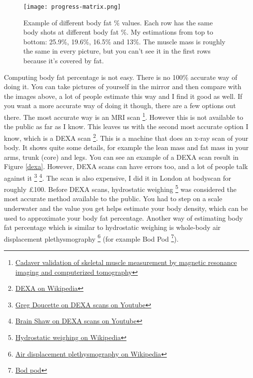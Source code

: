 \documentclass[openany, 12pt]{book}
\begin{document}
	\begin{figure}[h]
		\centering
		\texttt{[image: progress-matrix.png]}
		\caption{Example of different body fat \% values. Each row has the same body shots at different body fat \%. My estimations from top to bottom: 25.9\%, 19.6\%, 16.5\% and 13\%.
                The muscle mass is roughly the same in every picture, but you can't see it in the first rows because it's covered by fat.}
                \label{bodyfat}
	\end{figure}
	
	Computing body fat percentage is not easy. There is no 100\% accurate way of doing it. You can take pictures of yourself in the mirror and then compare with the images above,
        a lot of people estimate this way and I find it good as well. If you want a more accurate way of doing it though, there are a few options out there. The most accurate way is an MRI scan
        \footnote{\href{https://pubmed.ncbi.nlm.nih.gov/9655763/}{Cadaver validation of skeletal muscle measurement by magnetic resonance imaging and computerized tomography}}.
        However this is not available to the public as far as I know. This leaves us with the second most accurate option I know, which is a DEXA scan
        \footnote{\href{https://en.wikipedia.org/wiki/Dual-energy_X-ray_absorptiometry}{DEXA on Wikipedia}}. This is a machine that does an x-ray scan of your body. It shows quite some details,
        for example the lean mass and fat mass in your arms, trunk (core) and legs. You can see an example of a DEXA scan result in Figure \ref{dexa}.
        However, DEXA scans can have errors too, and a lot of people talk against it
        \footnote{\href{https://www.youtube.com/watch?v=2Gg4Jm5KS1Y}{Greg Doucette on DEXA scans on Youtube}}
        \footnote{\href{https://www.youtube.com/watch?v=P17bcpYE8Ew}{Brain Shaw on DEXA scans on Youtube}}. The scan is also expensive, I did it in London at bodyscan for roughly \pounds 100.
	Before DEXA scans, hydrostatic weighing
        \footnote{\href{https://en.wikipedia.org/wiki/Hydrostatic_weighing}{Hydrostatic weighing on Wikipedia}} was considered the most accurate method
        available to the public. You had to step on a scale underwater and the value you get helps estimate your body density, which can be used to approximate your body fat percentage.
        Another way of estimating body fat percentage which is similar to hydrostatic weighing is whole-body air displacement plethysmography
        \footnote{\href{https://en.wikipedia.org/wiki/Air_displacement_plethysmography}{Air displacement plethysmography on Wikipedia}} (for example Bod Pod
        \footnote{\href{https://www.cosmed.com/en/products/body-composition/bod-pod}{Bod pod}}).
        
\end{document}

